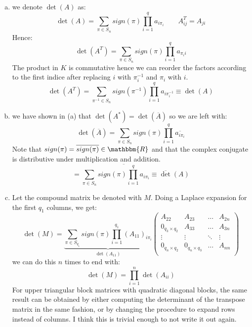 \documentclass[a4paper,10pt]{article}
\begin{document}
\subsection{}
\label{sub:four}
\begin{enumerate}[(a)]
	\item we denote $ \det(A)$ as:
		\begin{equation*}
			\det(A)= \sum_{\pi\in S_n} sign(\pi) \prod_{i=1}^{q}a_{i\pi_i} \qquad A_{ij}^T=A_{ji}
		\end{equation*}
		Hence:
		\begin{equation*}
			\det(A^T)= \sum_{\pi\in S_n} sign(\pi) \prod_{i=1}^{q}a_{\pi_ii} 
		\end{equation*}
		The product in $K$ is commutative hence we can reorder the factors according to the first indice after replacing $i$ with $\pi^{-1}_i$ and $\pi_i$ with $i$.
		\begin{equation*}
			\det(A^T)= \sum_{\pi^{-1}\in S_n} sign(\pi^{-1}) \prod_{i=1}^{q}a_{i\pi^{-1}_i}\equiv \det(A) 
		\end{equation*}
	\item we have shown in (a) that $ \det(A^*)=\det(\overline A)$ so we are left with:
	\begin{equation*}
	\det(\overline A)= \sum_{\pi\in S_n} sign(\pi) \prod_{i=1}^{q}\overline{a_{i\pi_i}} 
	\end{equation*}
	Note that $sign(\pi)=\overline{sign(\pi)}\in \mathbbm{R}$ and that the complex conjugate is distributive under multiplication and addition.
	\begin{equation*}
		= \sum_{\pi\in S_n}\overline{ sign(\pi) \prod_{i=1}^{q}a_{i\pi_i}}\equiv \overline \det(A) 
	\end{equation*}
\item Let the compound matrix be denoted with $M$. Doing a Laplace expansion for the first $q_1$ columns, we get:
	\begin{equation*}
		\det(M)= \underbrace{\sum_{\pi\in S_{q_1}}sign(\pi)\prod_{i=1}^{q_1}(A_{11})_{i\pi_i}}_{\det(A_{11})} \begin{pmatrix}
			A_{22}&A_{23}&\dots&A_{2n}\\
			0_{q_3\times q_2}&A_{33}&\dots&A_{3n}\\
			\vdots&\vdots&\ddots&\vdots\\
			0_{q_n\times q_2}&0_{q_n\times q_3}&\dots&A_{nn}\\
		\end{pmatrix}
	\end{equation*}
	we can do this $n$ times to end with:
	\begin{equation*}
		\det(M)=\prod_{i=1}^{n}\det(A_{ii})
	\end{equation*}
	For upper triangular block matrices with quadratic diagonal blocks, the same result can be obtained by either computing the determinant of the transpose matrix in the same fashion, or by changing the procedure to expand rows instead of columns. I think this is trivial enough to not write it out again.
\end{enumerate}
\end{document}
